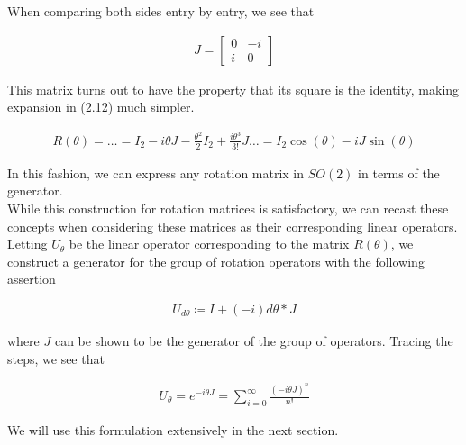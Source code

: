 When comparing both sides entry by entry, we see that 

\begin{equation}
	\begin{aligned}
		J = \begin{bmatrix}
			0 & -i \\
			i & 0
		\end{bmatrix}
	\end{aligned}
\end{equation}

This matrix turns out to have the property that its square is the identity, making expansion in (2.12) much simpler.

\begin{equation}
	\begin{aligned}
		R(\theta) = \hdots = I_2 -i\theta J - \frac{\theta^2}{2} I_2 + \frac{i\theta^3}{3!}J \hdots = I_2 \cos(\theta) -iJ \sin(\theta) 
	\end{aligned}
\end{equation}

In this fashion, we can express any rotation matrix in $SO(2)$ in terms of the generator. \\

While this construction for rotation matrices is satisfactory, we can recast these concepts when considering these matrices as their corresponding linear operators. Letting $U_\theta$ be the linear operator corresponding to the matrix $R(\theta)$, we construct a generator for the group of rotation operators with the following assertion

\begin{equation}
	\begin{aligned}
		U_{d\theta} \coloneq I + (-i)d\theta * J
	\end{aligned}
\end{equation}  

\noindent where $J$ can be shown to be the generator of the group of operators. Tracing the steps, we see that 

\begin{equation}
	\begin{aligned}
		U_\theta = e^{-i\theta J} = \sum_{i=0}^\infty \frac{(-i\theta J)^n}{n!}
	\end{aligned}
\end{equation}  


We will use this formulation extensively in the next section.


